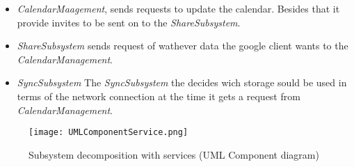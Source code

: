 

\begin{itemize}
	\item \textit{CalendarMaagement}, sends requests to update the calendar. Besides that it provide invites to be sent on to the \textit{ShareSubsystem}. 
	\item \textit{ShareSubsystem} sends request of wathever data the google client wants to the \textit{CalendarManagement}.
	\item \textit{SyncSubsystem} The \textit{SyncSubsystem} the decides wich storage sould be used in terms of the network connection at the time it gets a request from \textit{CalendarManagement}.
\end{itemize}

\begin{figure}[ht!]
\centering
\texttt{[image: UMLComponentService.png]}
\caption{Subsystem decomposition with services (UML Component diagram) \label{overflow}}
\end{figure}
